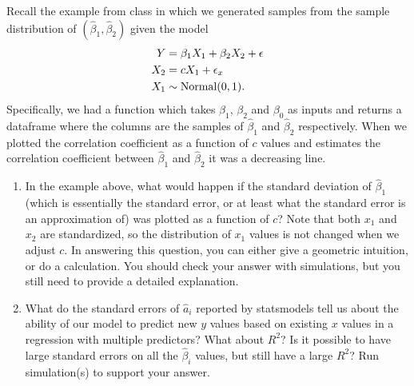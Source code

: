 %



 






\begin{exercise}[Collinearity]
Recall the example from class in which we generated samples from the sample distribution of $(\hat{\beta}_1,\hat{\beta}_2)$ given the model
\begin{align*}
Y &= \beta_1X_1 + \beta_2X_2 + \epsilon \\
X_2 &= cX_1 + \epsilon_x \\
X_1 &\sim {\rm Normal}(0,1). 
\end{align*} 
Specifically, we had a function which takes $\beta_1$, $\beta_2$ and $\beta_0$ as inputs and returns a dataframe where the columns are the samples of $\hat{\beta}_1$ and $\hat{\beta}_2$ respectively. When we plotted the correlation coefficient as a function of $c$ values and estimates the correlation coefficient between $\hat{\beta}_1$ and $\hat{\beta}_2$ it was a decreasing line. 

\begin{enumerate}
\item In the example above, what would happen if the standard deviation of $\hat{\beta}_1$ (which is essentially the standard error, or at least what the standard error is an approximation of) was plotted as a function of $c$? Note that both $x_1$ and $x_2$ are standardized, so the distribution of $x_1$ values is not changed when we adjust $c$. In answering this question, you can either give a geometric intuition, or do a calculation. You should check your answer with simulations, but you still need to provide a detailed explanation. 
\item What do the standard errors of $\hat{a}_i$ reported by statsmodels tell us about the ability of our model to predict new $y$ values based on existing $x$ values in a regression with multiple predictors? What about $R^2$? Is it possible to have large standard errors on all the $\hat{\beta}_i$ values, but still have a large $R^2$? Run simulation(s) to support your answer. 
\end{enumerate}
\end{exercise}
